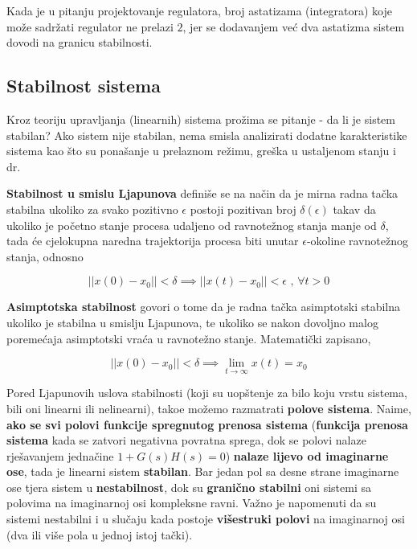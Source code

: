 \documentclass[12pt]{IEEEtran}
\numberwithin{equation}{subsection}
\numberwithin{figure}{section}
\begin{document}
\vspace{12pt}

Kada je u pitanju projektovanje regulatora, broj astatizama (integratora)
koje mo\v{z}e sadr\v{z}ati regulator ne prelazi $2$, jer se dodavanjem
ve\'{c} dva astatizma sistem dovodi na granicu stabilnosti.

\subsection{\textbf{Stabilnost sistema}}

Kroz teoriju upravljanja (linearnih) sistema pro\v{z}ima se pitanje - da li je
sistem stabilan? Ako sistem nije stabilan, nema smisla analizirati dodatne
karakteristike sistema kao \v{s}to su pona\v{s}anje u prelaznom re\v{z}imu,
gre\v{s}ka u ustaljenom stanju i dr.

\textbf{Stabilnost u smislu Ljapunova} defini\v{s}e se na na\v{c}in da je
mirna radna ta\v{c}ka stabilna ukoliko za svako pozitivno $\epsilon$ postoji
pozitivan broj $\delta(\epsilon)$ takav da ukoliko je po\v{c}etno stanje procesa
udaljeno od ravnote\v{z}nog stanja manje od $\delta$, tada \'{c}e cjelokupna
naredna trajektorija procesa biti unutar $\epsilon$-okoline ravnote\v{z}nog stanja,
odnosno

\begin{equation}
    ||x(0) - x_{0}|| < \delta \implies ||x(t) - x_{0}|| < \epsilon \text{ , } \forall t > 0
\end{equation}

\textbf{Asimptotska stabilnost} govori o tome da je radna ta\v{c}ka asimptotski
stabilna ukoliko je stabilna u smislju Ljapunova, te ukoliko se nakon dovoljno malog
poreme\'{c}aja asimptotski vra\'{c}a u ravnote\v{z}no stanje. Matemati\v{c}ki
zapisano,

\begin{equation}
    ||x(0) - x_{0}|| < \delta \implies \lim_{t \to \infty}{x(t)} = x_{0}
\end{equation}

Pored Ljapunovih uslova stabilnosti (koji su uop\v{s}tenje za bilo koju vrstu
sistema, bili oni linearni ili nelinearni), tako\dj{}e mo\v{z}emo razmatrati
\textbf{polove sistema}. Naime, \textbf{ako se svi polovi funkcije spregnutog prenosa sistema}
(\textbf{funkcija prenosa sistema} kada se zatvori negativna povratna sprega, dok se polovi
nalaze rje\v{s}avanjem jedna\v{c}ine $1 + G(s)H(s) = 0$) \textbf{nalaze lijevo od
imaginarne ose}, tada je linearni sistem \textbf{stabilan}. Bar jedan pol sa desne
strane imaginarne ose tjera sistem u \textbf{nestabilnost}, dok su \textbf{grani\v{c}no
stabilni} oni sistemi sa polovima na imaginarnoj osi kompleksne ravni. Va\v{z}no je 
napomenuti da su sistemi nestabilni i u slu\v{c}aju kada postoje \textbf{vi\v{s}estruki polovi}
na imaginarnoj osi (dva ili vi\v{s}e pola u jednoj istoj ta\v{c}ki).
\end{document}
